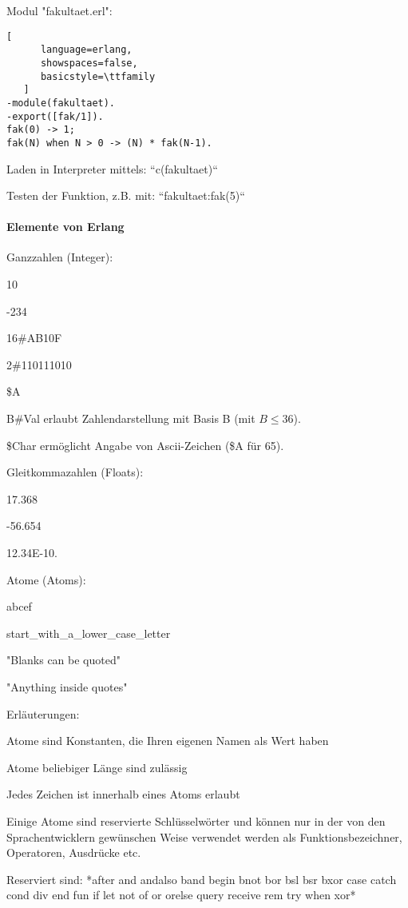 \documentclass[10pt]{article}
\begin{document}
\begin{itemize*}
Modul "fakultaet.erl":
\begin{lstlisting}[
      language=erlang,
      showspaces=false,
      basicstyle=\ttfamily
   ]
-module(fakultaet).
-export([fak/1]).
fak(0) -> 1;
fak(N) when N > 0 -> (N) * fak(N-1).
\end{lstlisting}

Laden in Interpreter mittels: ``c(fakultaet)``

Testen der Funktion, z.B. mit: ``fakultaet:fak(5)``

\paragraph{Elemente von Erlang}
Ganzzahlen (Integer):
\begin{itemize*}
  \item 10
  \item -234
  \item 16\#AB10F
  \item 2\#110111010
  \item \$A
  \item B\#Val erlaubt Zahlendarstellung mit Basis B (mit $B\leq 36$).
  \item \$Char ermöglicht Angabe von Ascii-Zeichen (\$A für 65).
\end{itemize*}

Gleitkommazahlen (Floats):
\begin{itemize*}
  \item 17.368
  \item -56.654
  \item 12.34E-10.
\end{itemize*}

Atome (Atoms):
\begin{itemize*}
  \item abcef
  \item start\_with\_a\_lower\_case\_letter
  \item "Blanks can be quoted"
  \item "Anything inside quotes"
  \item Erläuterungen:
  \begin{itemize*}
    \item Atome sind Konstanten, die Ihren eigenen Namen als Wert haben
    \item Atome beliebiger Länge sind zulässig
    \item Jedes Zeichen ist innerhalb eines Atoms erlaubt
    \item Einige Atome sind reservierte Schlüsselwörter und können nur in der von den Sprachentwicklern gewünschen Weise verwendet werden als Funktionsbezeichner, Operatoren, Ausdrücke etc.
    \item Reserviert sind: *after and andalso band begin bnot bor bsl bsr bxor case catch cond div end fun if let not of or orelse query receive rem try when xor*
  \end{itemize*}
\end{itemize*}


\end{itemize*}
\end{document}
